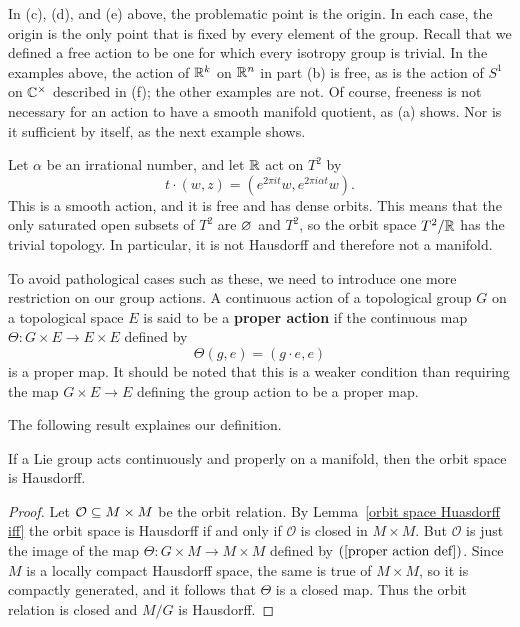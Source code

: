 In (c), (d), and (e) above, the problematic point is the origin. In each case, the origin is the only point that is fixed by every element of the group. Recall that we defined a free action to be one for which every isotropy group is
trivial. In the examples above, the action of $\mathbb{R}^k$ on $\mathbb{R}^n$ in part (b) is free, as is the action of $S^1$ on $\mathbb{C}^{\times}$ described in (f); the other examples are not. Of course, freeness is not necessary for an action to have a smooth manifold quotient, as (a) shows. Nor is it sufficient by itself, as the next example shows.
\begin{example}
Let $\alpha$ be an irrational number, and let $\mathbb{R}$ act on $T^2$ by
\[t\cdot(w,z)=(e^{2\pi it}w,e^{2\pi i\alpha t}w).\]
This is a smooth action, and it is free and has dense orbits. This means that the only saturated open subsets of $T^2$ are $\varnothing$ and $T^2$, so the orbit space $T^2/\mathbb{R}$ has the trivial topology. In particular, it is not Hausdorff and therefore not a manifold.
\end{example}
To avoid pathological cases such as these, we need to introduce one more restriction
on our group actions. A continuous action of a topological group $G$ on a topological space $E$ is said to be a \textbf{proper action} if the continuous map $\varTheta:G\times E\to E\times E$ defined by
\begin{equation}\label{proper action def}
\varTheta(g,e)=(g\cdot e,e)
\end{equation}
is a proper map. It should be noted that this is a weaker condition than requiring 
the map $G\times E\to E$ defining the group action to be a proper map.\par
The following result explaines our definition.
\begin{proposition}\label{proper action Hausdorff}
If a Lie group acts continuously and properly on a manifold, then the orbit space is Hausdorff.
\end{proposition}
\begin{proof}
Let $\mathcal{O}\subseteq M\times M$ be the orbit relation. By Lemma~\ref{orbit space Huasdorff iff} the orbit space is Hausdorff if and only if $\mathcal{O}$ is closed in $M\times M$. But $\mathcal{O}$ is just the image of the map $\varTheta:G\times M\to M\times M$ defined by $(\ref{proper action def})$. Since $M$ is a locally compact Hausdorff space, the same is true of $M\times M$, so it is compactly generated, and it follows that $\varTheta$ is a closed map. Thus the orbit relation is closed and $M/G$ is Hausdorff.
\end{proof}
